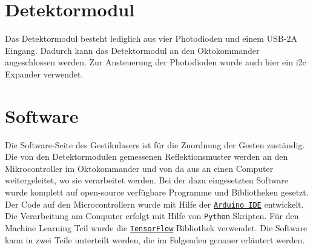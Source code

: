 
\section{Detektormodul}
\label{sec:Detektormodul}

Das Detektormodul besteht lediglich aus vier Photodioden und einem USB-2A Eingang. Dadurch kann das Detektormodul an den Oktokommander angeschlossen werden. Zur Ansteuerung der Photodioden wurde auch hier ein i2c Expander verwendet. 





\section{Software}
\label{sec:Software}

Die Software-Seite des Gestikulasers ist für die Zuordnung der Gesten zuständig. Die von den Detektormodulen gemessenen Reflektionsmuster werden an den Mikrocontroller im Oktokommander und von da aus an einen Computer weitergeleitet, wo sie verarbeitet werden. Bei der dazu eingesetzten Software wurde komplett auf open-source verfügbare Programme und Bibliotheken gesetzt. Der Code auf den Microcontrollern wurde mit Hilfe der \href{https://www.arduino.cc/en/Main/Software}{\texttt{Arduino IDE}} entwickelt. Die Verarbeitung am Computer erfolgt mit Hilfe von \texttt{Python} Skripten. Für den Machine Learning Teil wurde die \href{https://www.tensorflow.org/}{\texttt{TensorFlow}\texttrademark} Bibliothek verwendet. Die Software kann in zwei Teile unterteilt werden, die im Folgenden genauer erläutert werden.

